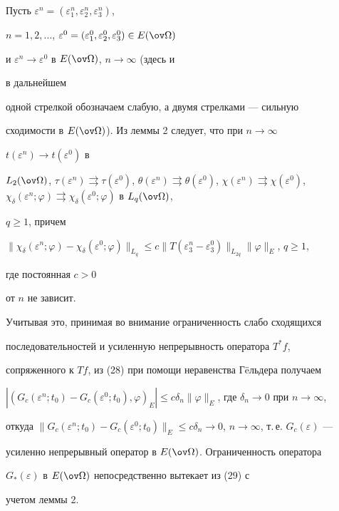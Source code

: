\begin{pf} 


Пусть $\varepsilon^n=(\varepsilon^n_1, \varepsilon^n_2, \varepsilon^n_3)$, 


$n=1,2,\dotsc$, $\varepsilon^0=(\varepsilon^0_1, \varepsilon^0_2, 


\varepsilon^0_3)\in E(\ov\Omega)$ 


и $\varepsilon^n\to\varepsilon^0$ в $E(\ov\Omega)$, $n\to\infty$ (здесь и 


в дальнейшем 


одной стрелкой обозначаем слабую, а двумя стрелками --- сильную 


сходимости в $E(\ov\Omega)$). Из леммы 2 следует, что при $n\to\infty$ \ 


$t(\varepsilon^n)\to t(\varepsilon^0)$ в 


$L_2(\ov\Omega)$, $\tau(\varepsilon^n)\rightrightarrows 


\tau(\varepsilon^0)$, $\theta(\varepsilon^n) \rightrightarrows 


\theta(\varepsilon^0)$, $\chi(\varepsilon^n) \rightrightarrows 


\chi(\varepsilon^0)$, $\chi_\delta(\varepsilon^n;\varphi) 


\rightrightarrows \chi_\delta(\varepsilon^0;\varphi)$ в $L_q(\ov\Omega)$, 


$q\ge1$, причем 


$\|\chi_\delta(\varepsilon^n;\varphi)- 


\chi_\delta(\varepsilon^0;\varphi)\|_{L_q}\le c\|T(\varepsilon^n_3- 


\varepsilon^0_3)\|_{L_{2q}} \|\varphi\|_E$, $q\ge1$, 


где постоянная $c>0$ 


от $n$ не зависит. 


 


Учитывая это, принимая во внимание ограниченность слабо сходящихся 


последовательностей и усиленную непрерывность оператора $T^*f$, 


сопряженного к $Tf$, из (28) при помощи неравенства Г\"eльдера получаем 


$|(G_c(\varepsilon^n;t_0)- G_c(\varepsilon^0;t_0), \varphi)_E|\le 


c\delta_n\|\varphi\|_E$, где $\delta_n\to0$ при $n\to\infty$, 


откуда $\|G_c(\varepsilon^n;t_0)- G_c(\varepsilon^0;t_0)\|_E\le 


c\delta_n\to0$, $n\to\infty$, т.\,е. $G_c(\varepsilon)$ --- 


усиленно непрерывный оператор в $E(\ov\Omega)$. Ограниченность оператора 


$G_*(\varepsilon)$ в $E(\ov\Omega)$ непосредственно вытекает из (29) с 


учетом леммы 2. 


\end{pf} 


